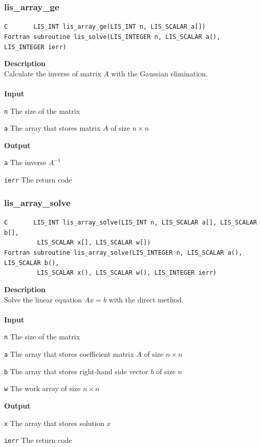 \documentclass[a4paper]{article}
\newcommand{\namelistlabel}[1]{\mbox{#1}\hfill}
\newenvironment{namelist}[1]{%
\begin{list}{}
  {\let\makelabel\namelistlabel
  \settowidth{\labelwidth}{#1}
  \setlength{\leftmargin}{1.1\labelwidth}}
  }{%
\end{list}}
\begin{document}
\newpage
\subsubsection{lis\_array\_ge}
\begin{screen}
\verb|C       LIS_INT lis_array_ge(LIS_INT n, LIS_SCALAR a[])|\\
\verb|Fortran subroutine lis_solve(LIS_INTEGER n, LIS_SCALAR a(), LIS_INTEGER ierr)|
\end{screen}
{\bf Description}\\
\indent
Calculate the inverse of matrix $A$ with the Gaussian elimination.
\\ \\
\noindent
{\bf Input}
\begin{namelist}{XXXXXXXXXXXXXXXXXXXX}
\item[\tt n] The size of the matrix
\item[\tt a] The array that stores matrix $A$ of size $n \times n$
\end{namelist}
{\bf Output}
\begin{namelist}{XXXXXXXXXXXXXXXXXXXX}
\item[\tt a] The inverse $A^{-1}$
\item[\tt ierr] The return code
\end{namelist}

\subsubsection{lis\_array\_solve}
\begin{screen}
\verb|C       LIS_INT lis_array_solve(LIS_INT n, LIS_SCALAR a[], LIS_SCALAR b[],|\\
\verb|         LIS_SCALAR x[], LIS_SCALAR w[])|\\
\verb|Fortran subroutine lis_array_solve(LIS_INTEGER n, LIS_SCALAR a(), LIS_SCALAR b(),|\\
\verb|         LIS_SCALAR x(), LIS_SCALAR w(), LIS_INTEGER ierr)|
\end{screen}
{\bf Description}\\
\indent
Solve the linear equation $Ax = b$ with the direct method.
\\ \\
\noindent
{\bf Input}
\begin{namelist}{XXXXXXXXXXXXXXXXXXXX}
\item[\tt n] The size of the matrix
\item[\tt a] The array that stores coefficient matrix $A$ of size $n \times n$
\item[\tt b] The array that stores right-hand side vector $b$ of size $n$
\item[\tt w] The work array of size $n \times n$
\end{namelist}
{\bf Output}
\begin{namelist}{XXXXXXXXXXXXXXXXXXXX}
\item[\tt x] The array that stores solution $x$
\item[\tt ierr] The return code
\end{namelist}
\end{document}
